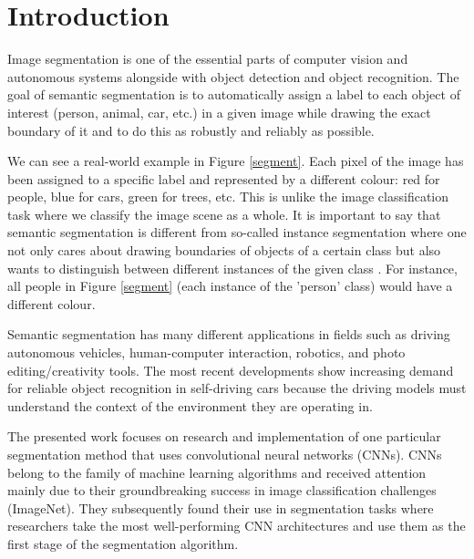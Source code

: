 \chapter{Introduction}
Image segmentation is one of the essential parts of computer vision and autonomous systems alongside with object detection and object recognition. The goal of semantic segmentation is to automatically assign a label to each object of interest (person, animal, car, etc.) in a given image while drawing the exact boundary of it and to do this as robustly and reliably as possible. 

We can see a real-world example in Figure \ref{segment}. Each pixel of the image has been assigned to a specific label and represented by a different colour: red for people, blue for cars, green for trees, etc. This is unlike the image classification task where we classify the image scene as a whole. It is important to say that semantic segmentation is different from so-called instance segmentation where one not only cares about drawing boundaries of objects of a certain class but also wants to distinguish between different instances of the given class \cite{stanford-L11}. For instance, all people in Figure \ref{segment} (each instance of the 'person' class) would have a different colour.

Semantic segmentation has many different applications in fields such as driving autonomous vehicles, human-computer interaction, robotics, and photo editing/creativity tools. The most recent developments show increasing demand for reliable object recognition in self-driving cars because the driving models must understand the context of the environment they are operating in. \cite{mwiti}

The presented work focuses on research and implementation of one particular segmentation method that uses convolutional neural networks (CNNs). CNNs belong to the family of machine learning algorithms and received attention mainly due to their groundbreaking success in image classification challenges (ImageNet). They subsequently found their use in segmentation tasks where researchers take the most well-performing CNN architectures and use them as the first stage of the segmentation algorithm.

